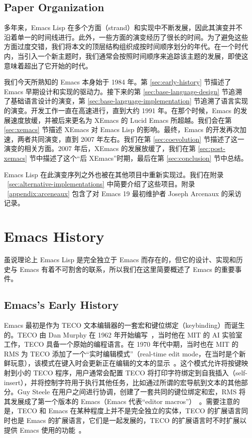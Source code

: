 \documentclass[format=acmsmall,screen]{acmart}
\begin{document}
\subsection{Paper Organization}

多年来，Emacs Lisp 在多个方面（strand）和实现中不断发展，因此其演变并不沿着单一的时间线进行。此外，一些方面的演变经历了很长的时间。为了避免这些方面过度交错，我们将本文的顶层结构组织成按时间顺序划分的年代。在一个时代内，当引入一个新主题时，我们通常会按照时间顺序来追踪该主题的发展，即使这意味着超出了它开始的时代。

我们今天所熟知的 Emacs 本身始于 1984 年。第 \ref{sec:early-history} 节描述了 Emacs 早期设计和实现的驱动力。接下来的第 \ref{sec:base-language-design} 节追溯了基础语言设计的演变，第 \ref{sec:base-language-implementation} 节追溯了语言实现的演变。开发工作一直在高速进行，直到大约 1991 年。在那个时候，Emacs 的发展速度放缓，并被后来更名为 XEmacs 的 Lucid Emacs 所超越。我们会在第 \ref{sec:xemacs} 节描述 XEmacs 对 Emacs Lisp 的影响。最终，Emacs 的开发再次加速，两者共同演变，直到 2007 年左右。我们在第 \ref{sec:coevolution} 节描述了这一演变的相关方面。2007 年后，XEmacs 的发展放缓了，我们在第 \ref{sec:post-xemacs} 节中描述了这个“后 XEmacs”时期，最后在第 \ref{sec:conclusion} 节中总结。

Emacs Lisp 在此演变序列之外也被在其他项目中重新实现过。我们在附录 ~\ref{sec:alternative-implementations} 中简要介绍了这些项目。附录 ~\ref{appendix:arceneaux} 包含了对 Emacs 19 最初维护者 Joseph Arcenaux 的采访记录。

\section{Emacs History}
\label{sec:emacs-history}

虽说理论上 Emacs Lisp 是完全独立于 Emacs 而存在的，但它的设计、实现和历史与 Emacs 有着不可割舍的联系，所以我们在这里简要概述了 Emacs 的重要事件。

\subsection{Emacs's Early History}
\label{sec:emacs-early-history}

Emacs 最初是作为 TECO 文本编辑器的一套宏和键位绑定（keybinding）而诞生的。TECO 由 Dan Murphy 在 1962 年开始编写~\cite{Murphy09}，当时他在 MIT 的 AI 实验室工作，TECO 具备一个原始的编程语言。在 1970 年代中期，当时也在 MIT 的 RMS 为 TECO 添加了一个“实时编辑模式”（real-time edit mode，在当时是个新鲜玩意），该模式在键入时会更新正在编辑的文本的显示~\cite{MulticsEmacs1996}。这个模式允许将按键映射到小的 TECO 程序，用户通常会配置 TECO 将打印字符绑定到自我插入（self-insert），并将控制字符用于执行其他任务，比如通过所谓的宏导航到文本的其他部分。Guy Steele 在用户之间进行协调，创建了一套共同的键位绑定和宏，RMS 将其发展成了第一个版本的 Emacs（Emacs 代表“editor macros”）~\cite{EmacsLore,Seibel2009}。需要注意的是，TECO 和 Emacs 在某种程度上并不是完全独立的实体，TECO 的扩展语言同时也是 Emacs 的扩展语言，它们是一起发展的，TECO 的扩展语言时不时扩展以提供 Emacs 使用的功能~\cite{Stallman2002}。
\end{document}
